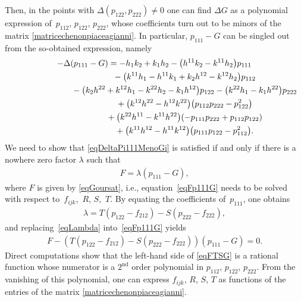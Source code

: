 \documentclass[10pt,a4paper]{amsart}
\newcommand{\Nd}{^\textrm{nd}}
\numberwithin{equation}{section}
\begin{document}
Then, in the points with $\Delta(p_{122},p_{222})\neq 0$ one can f\/ind $\Delta G$ as a polynomial expression of~$p_{112}$, $p_{122}$, $p_{222}$, whose coef\/f\/icients turn out to be minors of the matrix \eqref{matricechenonpiaceagianni}. In particular, $p_{111}-G$ can be singled out from the so-obtained expression, namely
\begin{gather}
-\Delta(p_{111}-G) =-h_1k_2+k_1h_2-\big(h^{11}k_2-k^{11}h_2\big)p_{111} \nonumber\\
\hphantom{-\Delta(p_{111}-G) =}{} -\big(k^{11}h_1-h^{11}k_1+k_2h^{12}-k^{12}h_2\big)p_{112}\nonumber\\
\hphantom{-\Delta(p_{111}-G) =}{}-\big(k_2h^{22}+k^{12}h_1-k^{22}h_2-k_1h^{12}\big)p_{122}-\big(k^{22}h_1-k_1h^{22}\big)p_{222} \nonumber\\
\hphantom{-\Delta(p_{111}-G) =}{}+\big(k^{12}h^{22}-h^{12}k^{22}\big)\big(p_{112}p_{222}-p_{122}^2\big) \nonumber\\
\hphantom{-\Delta(p_{111}-G) =}{} + \big(k^{22}h^{11}-k^{11}h^{22}\big)(-p_{111}p_{222}+p_{112}p_{122}) \nonumber\\
\hphantom{-\Delta(p_{111}-G) =}{}+\big(k^{11}h^{12}-h^{11}k^{12}\big) \big(p_{111}p_{122}-p_{112}^2\big).\label{eqDeltaPi111MenoGi}
\end{gather}
We need to show that \eqref{eqDeltaPi111MenoGi} is satisf\/ied if and only if there is a nowhere zero factor $\lambda$ such that
 \begin{gather}\label{eqFp111G}
F=\lambda (p_{111}-G),
\end{gather}
where $F$ is given by \eqref{eqGoursat}, i.e., equation~\eqref{eqFp111G} needs to be solved with respect to~$f_{ijk}$,~$R$, $S$,~$T$. By equating the coef\/f\/icients of~$p_{111}$, one obtains
\begin{gather}\label{eqLambda}
\lambda= T(p_{122}-f_{212})-S(p_{222}-f_{222}),
\end{gather}
and replacing~\eqref{eqLambda} into~\eqref{eqFp111G} yields
\begin{gather}\label{eqFTSG}
F-( T(p_{122}-f_{212})-S(p_{222}-f_{222}))(p_{111}-G)=0.
\end{gather}
Direct computations show that the left-hand side of
 \eqref{eqFTSG} is a rational function whose numerator is a $2\Nd$ order polynomial in $p_{112}$, $p_{122}$, $p_{222}$. From the vanishing of this polynomial, one can express $f_{ijk}$, $R$, $S$, $T $ as functions of the entries of the matrix \eqref{matricechenonpiaceagianni}.
\end{document}
